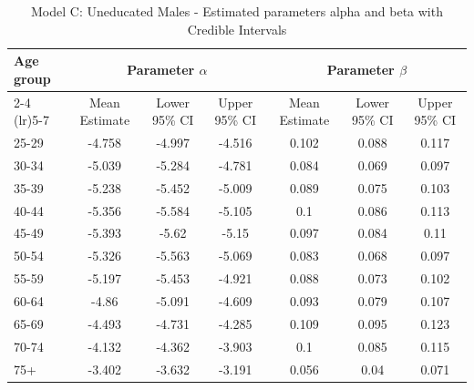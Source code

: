 \begin{landscape}
\begin{table}[htbp]
\centering
\caption{Model C: Uneducated Males - Estimated parameters alpha and beta  with Credible Intervals}
\label{tab:parameters_ab21}
\begin{tabular}{@{}lcccccc@{}}
\toprule
Age group & \multicolumn{3}{c}{Parameter \(\alpha\)} & \multicolumn{3}{c}{Parameter \(\beta\)} \\ 
\cmidrule(lr){2-4} \cmidrule(lr){5-7}
          & Mean Estimate & Lower 95\% CI & Upper 95\% CI & Mean Estimate & Lower 95\% CI & Upper 95\% CI \\ 
\midrule
25-29 & -4.758 & -4.997 & -4.516 & 0.102 & 0.088 & 0.117 \\
30-34 & -5.039 & -5.284 & -4.781 & 0.084 & 0.069 & 0.097 \\
35-39 & -5.238 & -5.452 & -5.009 & 0.089 & 0.075 & 0.103 \\
40-44 & -5.356 & -5.584 & -5.105 & 0.1 & 0.086 & 0.113 \\
45-49 & -5.393 & -5.62 & -5.15 & 0.097 & 0.084 & 0.11 \\
50-54 & -5.326 & -5.563 & -5.069 & 0.083 & 0.068 & 0.097 \\
55-59 & -5.197 & -5.453 & -4.921 & 0.088 & 0.073 & 0.102 \\
60-64 & -4.86 & -5.091 & -4.609 & 0.093 & 0.079 & 0.107 \\
65-69 & -4.493 & -4.731 & -4.285 & 0.109 & 0.095 & 0.123 \\
70-74 & -4.132 & -4.362 & -3.903 & 0.1 & 0.085 & 0.115 \\
75+ & -3.402 & -3.632 & -3.191 & 0.056 & 0.04 & 0.071 \\
\bottomrule
\end{tabular}
\end{table}
\end{landscape}